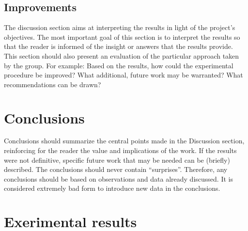\subsection{Improvements}


The discussion section aims at interpreting the results in light of the project's objectives. The most important goal of this section is to interpret the results so that the reader is informed of the insight or answers that the results provide. This section should also present an evaluation of the particular approach taken by the group. For example: Based on the results, how could the experimental procedure be improved? What additional, future work may be warranted? What recommendations can be drawn?


\section{Conclusions}
Conclusions should summarize the central points made in the Discussion section, reinforcing for the reader the value and implications of the work. If the results were not definitive, specific future work that may be needed can be (briefly) described. The conclusions should never contain ``surprises''. Therefore, any conclusions should be based on observations and data already discussed. It is considered extremely bad form to introduce new data in the conclusions.













\newpage
\appendix
\section{Exerimental results}


